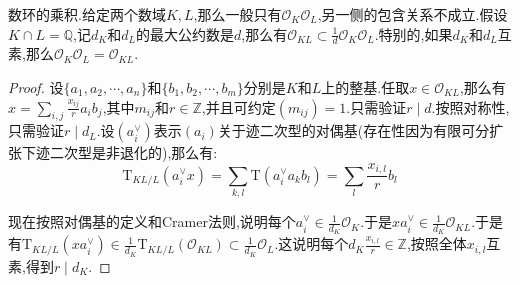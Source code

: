 数环的乘积.给定两个数域$K,L$,那么一般只有$\mathscr{O}_K\mathscr{O}_L$,另一侧的包含关系不成立.假设$K\cap L=\mathbb{Q}$,记$d_K$和$d_L$的最大公约数是$d$,那么有$\mathscr{O}_{KL}\subset\frac{1}{d}\mathscr{O}_K\mathscr{O}_L$.特别的,如果$d_K$和$d_L$互素,那么$\mathscr{O}_K\mathscr{O}_L=\mathscr{O}_{KL}$.
\begin{proof}
	
	设$\{a_1,a_2,\cdots,a_n\}$和$\{b_1,b_2,\cdots,b_m\}$分别是$K$和$L$上的整基.任取$x\in\mathscr{O}_{KL}$,那么有$x=\sum_{i,j}\frac{x_{ij}}{r}a_ib_j$,其中$m_{ij}$和$r\in\mathbb{Z}$,并且可约定$(m_{ij})=1$.只需验证$r\mid d$.按照对称性,只需验证$r\mid d_L$.设$(a_i^{\vee})$表示$(a_i)$关于迹二次型的对偶基(存在性因为有限可分扩张下迹二次型是非退化的),那么有:
	$$\mathrm{T}_{KL/L}(a_i^{\vee}x)=\sum_{k,l}\mathrm{T}(a_i^{\vee}a_kb_l)=\sum_l\frac{x_{i,l}}{r}b_l$$
	
	现在按照对偶基的定义和Cramer法则,说明每个$a_i^{\vee}\in\frac{1}{d_K}\mathscr{O}_K$.于是$xa_i^{\vee}\in\frac{1}{d_K}\mathscr{O}_{KL}$.于是有$\mathrm{T}_{KL/L}(xa_i^{\vee})\in\frac{1}{d_K}\mathrm{T}_{KL/L}(\mathscr{O}_{KL})\subset\frac{1}{d_K}\mathscr{O}_L$.这说明每个$d_K\frac{x_{i,l}}{r}\in\mathbb{Z}$,按照全体$x_{i,l}$互素,得到$r\mid d_K$.
\end{proof}

